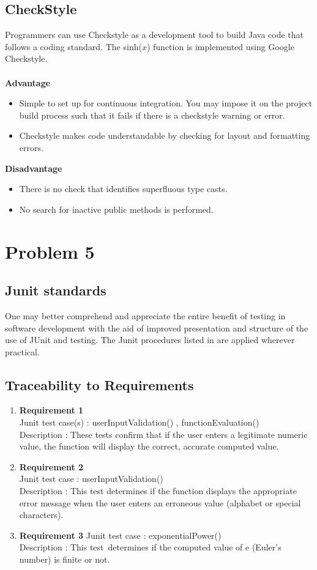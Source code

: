 \documentclass[
	12pt
]{article}
\begin{document}
\subsection{CheckStyle}
Programmers can use Checkstyle as a development tool to build Java code that follows a coding standard\cite{checkstyle}. The sinh($x$) function is implemented using Google Checkstyle. \\ \\
\textbf{Advantage}
\begin{itemize}
    \item Simple to set up for continuous integration. You may impose it on the project build process such that it fails if there is a checkstyle warning or error.
    \item Checkstyle makes code understandable by checking for layout and formatting errors.
\end{itemize}
\textbf{Disadvantage}
\begin{itemize}
    \item There is no check that identifies superfluous type casts.
    \item No search for inactive public methods is performed.
\end{itemize}

\section{Problem 5}
\subsection{Junit standards}
 One may better comprehend and appreciate the entire benefit of testing in software development with the aid of improved presentation and structure of the use of JUnit and testing. The Junit procedures listed in are applied wherever practical.
\subsection{Traceability to Requirements}
\begin{enumerate}
    \item \textbf{Requirement 1}\\
    Junit test case(s) : userInputValidation() , functionEvaluation() \\
    Description : These tests confirm that if the user enters a legitimate numeric value, the function will display the correct, accurate computed value.
    \item
    \textbf{Requirement 2} \\
    Junit test case : userInputValidation() \\
    Description : This test determines if the function displays the appropriate error message when the user enters an erroneous value (alphabet or special characters).
    \item
   \textbf{Requirement 3} \newline
    Junit test case : exponentialPower() \\
    Description : This test determines if the computed value of e (Euler's number) is finite or not.
\end{enumerate}
\end{document}
